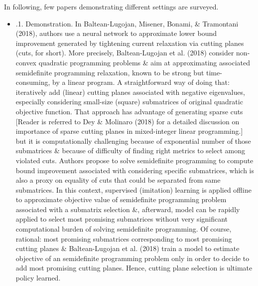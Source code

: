 \documentclass{article}
\begin{document}
\begin{itemize}
\begin{itemize}
        In following, few papers demonstrating different settings are surveyed.
        \begin{itemize}
            \item {.1. Demonstration.} In Baltean-Lugojan, Misener, Bonami, \& Tramontani (2018), authors use a neural network to approximate lower bound improvement generated by tightening current relaxation via cutting planes (cuts, for short). More precisely, Baltean-Lugojan et al. (2018) consider non-convex quadratic programming problems \& aim at approximating associated semidefinite programming relaxation, known to be strong but time-consuming, by a linear program. A straightforward way of doing that: iteratively add (linear) cutting planes associated with negative eigenvalues, especially considering small-size (square) submatrices of original quadratic objective function. That approach has advantage of generating sparse cuts [Reader is referred to Dey \& Molinaro (2018) for a detailed discussion on importance of sparse cutting planes in mixed-integer linear programming.] but it is computationally challenging because of exponential number of those submatrices \& because of difficulty of finding right metrics to select among violated cuts. Authors propose to solve semidefinite programming to compute bound improvement associated with considering specific submatrices, which is also a proxy on equality of cuts that could be separated from same submatrices. In this context, supervised (imitation) learning is applied offline to approximate objective value of semidefinite programming problem associated with a submatrix selection \&, afterward, model can be rapidly applied to select most promising submatrices without very significant computational burden of solving semidefinite programming. Of course, rational: most promising submatrices corresponding to most promising cutting planes \& Baltean-Lugojan et al. (2018) train a model to estimate objective of an semidefinite programming problem only in order to decide to add most promising cutting planes. Hence, cutting plane selection is ultimate policy learned.


\end{itemize}
\end{itemize}
\end{itemize}
\end{document}
